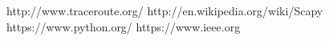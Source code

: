 \documentclass[%
        final,
        notitlepage,
        narroweqnarray,
        inline,
        ]{ieee}
\begin{document}
\begin{thebibliography}{1}

http://www.traceroute.org/
http://en.wikipedia.org/wiki/Scapy
https://www.python.org/
https://www.ieee.org
\end{thebibliography}




%
%
%
%
% 
% 
% 
% 
% 
% 
% 
% 
% 
% 
%
% 
\end{document}
